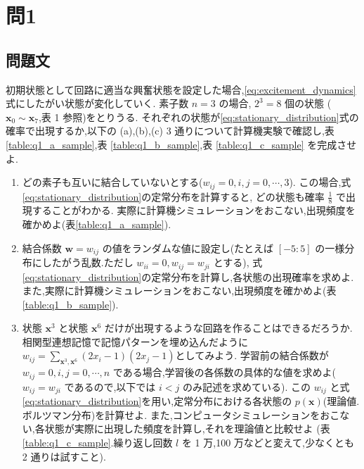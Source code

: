 \documentclass[a4j, uplatex, fleqn, dvipdfmx]{jsarticle} %
\begin{document}
\section{問1}
\subsection{問題文}
初期状態として回路に適当な興奮状態を設定した場合,\eqref{eq:excitement_dynamics}式にしたがい状態が変化していく.
素子数 $n = 3$ の場合, $2^3 = 8$ 個の状態 ($\bm{x}_0 \sim \bm{x}_7$,表 1 参照)をとりうる.
それぞれの状態が\eqref{eq:stationary_distribution}式の確率で出現するか,以下の (a),(b),(c) 3 通りについて計算機実験で確認し,表 \ref{table:q1_a_sample},表 \ref{table:q1_b_sample},表 \ref{table:q1_c_sample} を完成させよ.
\begin{enumerate}[label=(\alph{enumi}), ref=(\alph{enumi})]
  \item \label{item:q1_a}
    どの素子も互いに結合していないとする($w_{ij} = 0, i, j = 0, \cdots, 3$).
    この場合,式\eqref{eq:stationary_distribution}の定常分布を計算すると, どの状態も確率 $\frac{1}{8}$ で出現することがわかる. 
    実際に計算機シミュレーションをおこない,出現頻度を確かめよ(表\ref{table:q1_a_sample}).
  \item \label{item:q1_b}
    結合係数 $\bm{w} = {w_{ij}}$ の値をランダムな値に設定し(たとえば $[-5:5]$ の一様分布にしたがう乱数.ただし $w_{ii} = 0, w_{ij} = w_{ji}$ とする),
    式\eqref{eq:stationary_distribution}の定常分布を計算し,各状態の出現確率を求めよ.
    また,実際に計算機シミュレーションをおこない,出現頻度を確かめよ(表\ref{table:q1_b_sample}).
  \item \label{item:q1_c} 
    状態 $\bm{x}^3$ と状態 $\bm{x}^6$ だけが出現するような回路を作ることはできるだろうか.
    相関型連想記憶で記憶パターンを埋め込んだように$w_{i j}=\sum_{\bm{x}^{3}, \bm{x}^{6}}\left(2 x_{i}-1\right)\left(2 x_{j}-1\right)$としてみよう.
    学習前の結合係数が $w_{ij} = 0, i, j = 0, \cdots, n$ である場合,学習後の各係数の具体的な値を求めよ($w_{ij} = w_{ji}$ であるので,以下では $i < j$ のみ記述を求めている).
    この {$w_{ij}$} と式\eqref{eq:stationary_distribution}を用い,定常分布における各状態の $p(\bm{x})$(理論値.ボルツマン分布)を計算せよ.
    また,コンピュータシミュレーションをおこない,各状態が実際に出現した頻度を計算し,それを理論値と比較せよ
    (表 \ref{table:q1_c_sample}.繰り返し回数 $l$ を 1 万,100 万などと変えて,少なくとも 2 通りは試すこと).
\end{enumerate}
\end{document}
